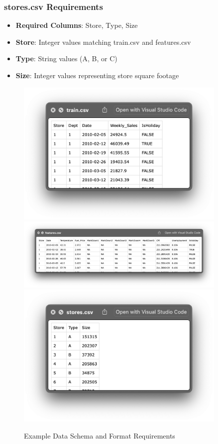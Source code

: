 \subsubsection{stores.csv Requirements}
\begin{itemize}
	\item \textbf{Required Columns}: Store, Type, Size
	\item \textbf{Store}: Integer values matching train.csv and features.csv
	\item \textbf{Type}: String values (A, B, or C)
	\item \textbf{Size}: Integer values representing store square footage
\end{itemize}

\begin{figure}[H]
	\centering
	\includegraphics[width=0.9\textwidth]{Images/06SystemSpecifications/DataSchemaTrainExample.png}
	\includegraphics[width=0.9\textwidth]{Images/06SystemSpecifications/DataSchemaFeatureExample.png}
		\includegraphics[width=0.9\textwidth]{Images/06SystemSpecifications/DataSchemaStoreExample.png} 
			\caption{Example Data Schema and Format Requirements}
	\label{fig:data_schema_example}
\end{figure}

